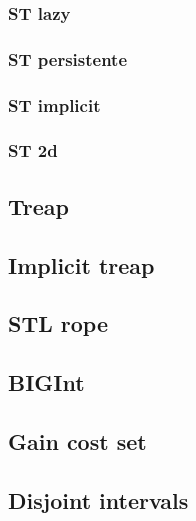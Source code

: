 \subsubsection{ST lazy}

\subsubsection{ST persistente}

\subsubsection{ST implicit}

\subsubsection{ST 2d}


\subsection{Treap}

\subsection{Implicit treap}

\subsection{STL rope}


\subsection{BIGInt}

\subsection{Gain cost set}

\subsection{Disjoint intervals}


